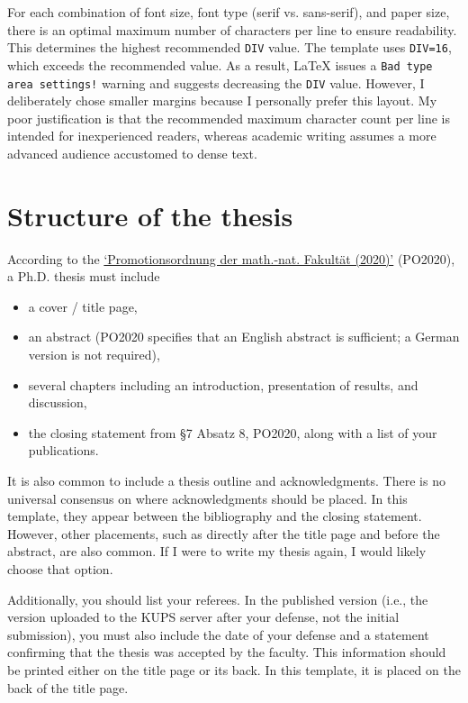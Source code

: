 For each combination of font size, font type (serif vs. sans-serif), and paper size, there is an optimal maximum number of characters per line to ensure readability. This determines the highest recommended \verb|DIV| value. The template uses \verb|DIV=16|, which exceeds the recommended value. As a result, LaTeX issues a \verb|Bad type area settings!| warning and suggests decreasing the \verb|DIV| value.
However, I deliberately chose smaller margins because I personally prefer this layout. My poor justification is that the recommended maximum character count per line is intended for inexperienced readers, whereas academic writing assumes a more advanced audience accustomed to dense text.



\section{Structure of the thesis}

According to the \href{https://mathnat.uni-koeln.de/sites/dekanat/official/Ordnungen/Promotionsordnung_2020.pdf}{`Promotionsordnung der math.-nat. Fakultät (2020)'} (PO2020), a Ph.D. thesis must include
\begin{itemize}
	\item a cover / title page,
	\item an abstract (PO2020 specifies that an English abstract is sufficient; a German version is not required),
	\item several chapters including an introduction, presentation of results, and discussion,
	\item the closing statement from §7 Absatz 8, PO2020, along with a list of your publications.
\end{itemize}
It is also common to include a thesis outline and acknowledgments. There is no universal consensus on where acknowledgments should be placed. In this template, they appear between the bibliography and the closing statement. However, other placements, such as directly after the title page and before the abstract, are also common. If I were to write my thesis again, I would likely choose that option.

Additionally, you should list your referees. In the published version (i.e., the version uploaded to the KUPS server after your defense, not the initial submission), you must also include the date of your defense and a statement confirming that the thesis was accepted by the faculty. This information should be printed either on the title page or its back. In this template, it is placed on the back of the title page.

